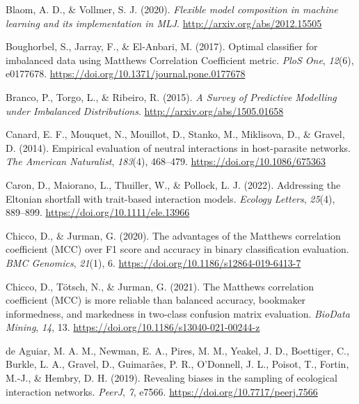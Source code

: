 \documentclass[11pt]{article}
\newlength{\cslhangindent}
\newenvironment{CSLReferences}[2] %
 {%
  \setlength{\parindent}{0pt}
  \ifodd #1 \everypar{\setlength{\hangindent}{\cslhangindent}}\ignorespaces\fi
  \ifnum #2 > 0
  \setlength{\parskip}{#2\baselineskip}
  \fi
 }%
 {}
\begin{document}
\begin{CSLReferences}{1}{0}
\leavevmode{}%
Blaom, A. D., \& Vollmer, S. J. (2020). \emph{Flexible model composition
in machine learning and its implementation in MLJ}.
\url{http://arxiv.org/abs/2012.15505}

\leavevmode{}%
Boughorbel, S., Jarray, F., \& El-Anbari, M. (2017). Optimal classifier
for imbalanced data using Matthews Correlation Coefficient metric.
\emph{PloS One}, \emph{12}(6), e0177678.
\url{https://doi.org/10.1371/journal.pone.0177678}

\leavevmode{}%
Branco, P., Torgo, L., \& Ribeiro, R. (2015). \emph{A Survey of
Predictive Modelling under Imbalanced Distributions}.
\url{http://arxiv.org/abs/1505.01658}

\leavevmode{}%
Canard, E. F., Mouquet, N., Mouillot, D., Stanko, M., Miklisova, D., \&
Gravel, D. (2014). Empirical evaluation of neutral interactions in
host-parasite networks. \emph{The American Naturalist}, \emph{183}(4),
468--479. \url{https://doi.org/10.1086/675363}

\leavevmode{}%
Caron, D., Maiorano, L., Thuiller, W., \& Pollock, L. J. (2022).
Addressing the Eltonian shortfall with trait-based interaction models.
\emph{Ecology Letters}, \emph{25}(4), 889--899.
\url{https://doi.org/10.1111/ele.13966}

\leavevmode{}%
Chicco, D., \& Jurman, G. (2020). The advantages of the Matthews
correlation coefficient (MCC) over F1 score and accuracy in binary
classification evaluation. \emph{BMC Genomics}, \emph{21}(1), 6.
\url{https://doi.org/10.1186/s12864-019-6413-7}

\leavevmode{}%
Chicco, D., Tötsch, N., \& Jurman, G. (2021). The Matthews correlation
coefficient (MCC) is more reliable than balanced accuracy, bookmaker
informedness, and markedness in two-class confusion matrix evaluation.
\emph{BioData Mining}, \emph{14}, 13.
\url{https://doi.org/10.1186/s13040-021-00244-z}

\leavevmode{}%
de Aguiar, M. A. M., Newman, E. A., Pires, M. M., Yeakel, J. D.,
Boettiger, C., Burkle, L. A., Gravel, D., Guimarães, P. R., O'Donnell,
J. L., Poisot, T., Fortin, M.-J., \& Hembry, D. H. (2019). Revealing
biases in the sampling of ecological interaction networks. \emph{PeerJ},
\emph{7}, e7566. \url{https://doi.org/10.7717/peerj.7566}


\end{CSLReferences}
\end{document}
